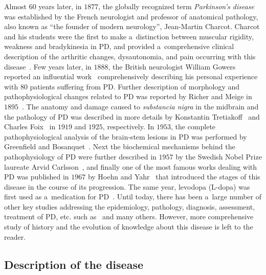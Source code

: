 Almost 60 years later, in $1877$, the globally recognized term \textit{Parkinson's disease} was established by the French neurologist and professor of anatomical pathology, also known as ``the founder of modern neurology'', Jean-Martin Charcot. Charcot and his students were the first to make a~distinction between muscular rigidity, weakness and bradykinesia in PD, and provided a~comprehensive clinical description of the arthritic changes, dysautonomia, and pain occurring with this disease~\cite{Charcot1877}. Few years later, in $1888$, the British neurologist William Gowers reported an influential work~\cite{Gowers1886} comprehensively describing his personal experience with $80$ patients suffering from PD. Further description of morphology and pathophysiological changes related to PD was reported by Richer and Meige in $1895$~\cite{Richer1895}. The anatomy and damage caused to \textit{substancia nigra} in the midbrain and the pathology of PD was described in more details by Konstantin Tretiakoff~\cite{Tretiakoff1919} and Charles Foix~\cite{Foix1925} in $1919$ and $1925$, respectively. In $1953$, the complete pathophysiological analysis of the brain-stem lesions in PD was performed by Greenfield and Bosanquet~\cite{Greenfield1953}. Next the biochemical mechanisms behind the pathophysiology of PD were further described in $1957$ by the Swedish Nobel Prize laureate Arvid Carlsson~\cite{Carlsson1957}, and finally one of the most famous works dealing with PD was published in $1967$ by Hoehn and Yahr~\cite{Hoehn1967} that introduced the stages of this disease in the course of its progression. The same year, levodopa (L-dopa) was first used as a~medication for PD~\cite{Fahn2008}. Until today, there has been a~large number of other key studies addressing the epidemiology, pathology, diagnosis, assessment, treatment of PD, etc. such as~\cite{Hornykiewicz1970, Rijk1997, Hornykiewicz1998, Jankovic2001} and many others. However, more comprehensive study of history and the evolution of knowledge about this disease is left to the reader.

\subsection{Description of the disease}
\label{ch1_1.2}

